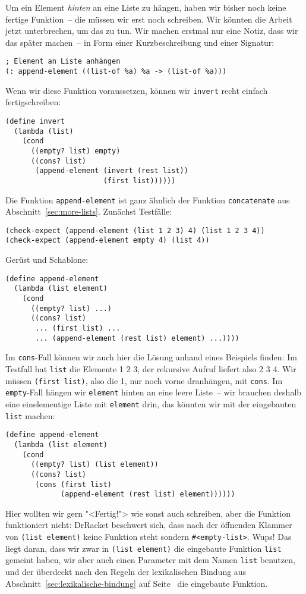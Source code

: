 Um ein Element \emph{hinten} an eine Liste zu hängen, haben wir bisher
noch keine fertige Funktion~-- die müssen wir erst noch schreiben.
Wir könnten die Arbeit jetzt unterbrechen, um das zu tun.  Wir machen
erstmal nur eine Notiz, dass wir das später machen~-- in Form einer
Kurzbeschreibung und einer Signatur:
%
\begin{lstlisting}
; Element an Liste anhängen
(: append-element ((list-of %a) %a -> (list-of %a)))
\end{lstlisting}
%
Wenn wir diese Funktion voraussetzen, können wir \lstinline{invert}
recht einfach fertigschreiben:
%
\begin{lstlisting}
(define invert
  (lambda (list)
    (cond
      ((empty? list) empty)
      ((cons? list)
       (append-element (invert (rest list))
                       (first list))))))
\end{lstlisting}
%
Die Funktion \lstinline{append-element} ist ganz ähnlich der Funktion
\lstinline{concatenate} aus Abschnitt~\ref{sec:more-lists}.  Zunächst
Testfälle:
%
\begin{lstlisting}
(check-expect (append-element (list 1 2 3) 4) (list 1 2 3 4))
(check-expect (append-element empty 4) (list 4))
\end{lstlisting}
%
Gerüst und Schablone:
%
\begin{lstlisting}
(define append-element
  (lambda (list element)
    (cond
      ((empty? list) ...)
      ((cons? list)
       ... (first list) ...
       ... (append-element (rest list) element) ...))))
\end{lstlisting}
%
Im \lstinline{cons}-Fall können wir auch hier die Lösung anhand eines
Beispiels finden: Im Testfall hat \lstinline{list} die Elemente 1 2 3,
der rekursive Aufruf liefert also 2 3 4.  Wir müssen
\lstinline{(first list)}, also die 1, nur noch vorne dranhängen, mit
\lstinline{cons}. Im \lstinline{empty}-Fall hängen wir
\lstinline{element} hinten an eine leere Liste~-- wir brauchen deshalb
eine einelementige Liste mit \lstinline{element} drin, das könnten wir
mit der eingebauten \lstinline{list} machen:
%
\begin{lstlisting}
(define append-element
  (lambda (list element)
    (cond
      ((empty? list) (list element))
      ((cons? list)
       (cons (first list)
             (append-element (rest list) element))))))
\end{lstlisting}
%
Hier wollten wir gern "<Fertig!"> wie sonst auch schreiben, aber die
Funktion funktioniert nicht: DrRacket beschwert sich, dass nach der
öffnenden Klammer von \lstinline{(list element)} keine Funktion steht
sondern \lstinline{#<empty-list>}.  Wups!  Das liegt daran, dass wir
zwar in \lstinline{(list element)} die eingebaute Funktion
\lstinline{list} gemeint haben,
wir aber auch einen Parameter mit dem Namen \lstinline{list}
benutzen, und der
überdeckt nach den Regeln der lexikalischen Bindung aus
Abschnitt~\ref{sec:lexikalische-bindung} auf
Seite~\pageref{sec:lexikalische-bindung} die
eingebaute Funktion.

